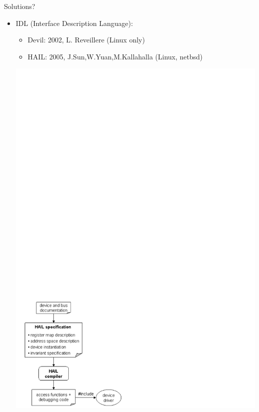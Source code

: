 \documentclass[xcolor={usenames,svgnames}]{beamer}
\begin{document}
\begin{frame}[fragile]{Solutions?}
\begin{itemize}
\item IDL (Interface Description Language):
\begin{itemize}
\item Devil: 2002, L. Reveillere (Linux only)
\item HAIL: 2005, J.Sun,W.Yuan,M.Kallahalla (Linux, netbsd)
\end{itemize}
\begin{center}
\includegraphics[scale=0.5,viewport=1 100 600 260]{hail_overview.pdf}
\end{center}
\end{itemize}
\end{frame}
\end{document}
